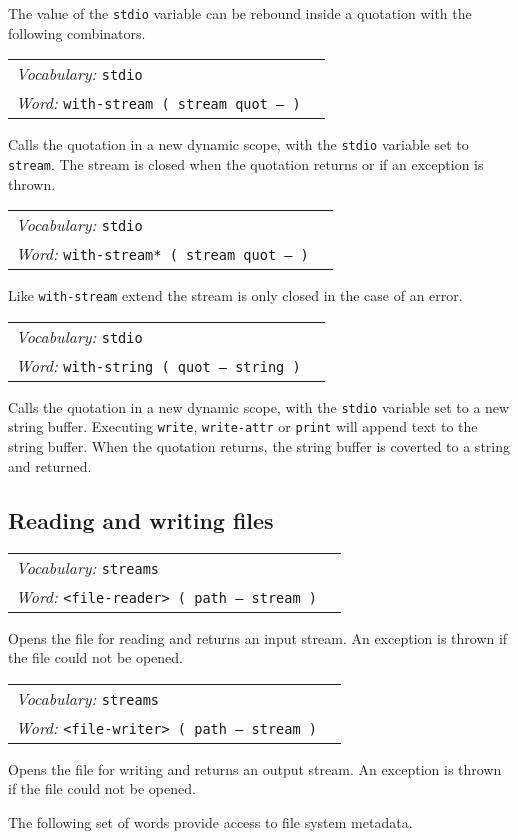 \documentclass{book}
\newcommand{\vocabulary}[1]{\emph{Vocabulary:} \texttt{#1}&\\}
\newcommand{\ordinaryword}[2]{\index{\texttt{#1}}\emph{Word:} \texttt{#2}&\\}
\newcommand{\wordtable}[1]{

\begin{tabularx}{12cm}[t]{lX}
\hline
#1
\hline
\end{tabularx}

}
\begin{document}
The value of the \texttt{stdio} variable can be rebound inside a quotation with the following combinators.

\wordtable{
\vocabulary{stdio}
\ordinaryword{with-stream}{with-stream ( stream quot -- )}
}
Calls the quotation in a new dynamic scope, with the \texttt{stdio} variable set to \texttt{stream}. The stream is closed when the quotation returns or if an exception
is thrown.
\wordtable{
\vocabulary{stdio}
\ordinaryword{with-stream*}{with-stream* ( stream quot -- )}
}
Like \verb|with-stream| extend the stream is only closed in the case of an error.

\wordtable{
\vocabulary{stdio}
\ordinaryword{with-string}{with-string ( quot -- string )}

}
Calls the quotation in a new dynamic scope, with the \texttt{stdio} variable set to a new string buffer. Executing \texttt{write}, \texttt{write-attr} or \texttt{print} will append text to the string buffer. When the quotation returns, the string buffer is coverted to
a string and returned.

\subsection{Reading and writing files}

\wordtable{
\vocabulary{streams}
\ordinaryword{<file-reader>}{<file-reader> ( path -- stream )}

}
Opens the file for reading and returns an input stream. An exception is thrown if the file could not be opened.
\wordtable{
\vocabulary{streams}
\ordinaryword{<file-writer>}{<file-writer> ( path -- stream )}

}
Opens the file for writing and returns an output stream. An exception is thrown if the file could not be opened.

The following set of words provide access to file system metadata.
\end{document}
